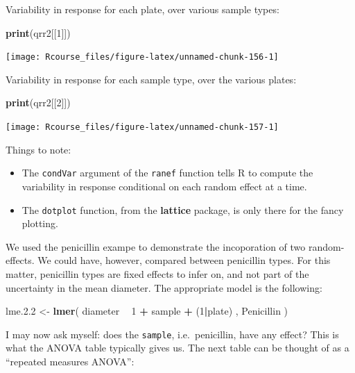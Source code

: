 \documentclass[]{book}
\newenvironment{Shaded}{\begin{snugshade}}{\end{snugshade}}
\newcommand{\KeywordTok}[1]{\textcolor[rgb]{0.13,0.29,0.53}{\textbf{#1}}}
\newcommand{\DecValTok}[1]{\textcolor[rgb]{0.00,0.00,0.81}{#1}}
\newcommand{\FloatTok}[1]{\textcolor[rgb]{0.00,0.00,0.81}{#1}}
\newcommand{\StringTok}[1]{\textcolor[rgb]{0.31,0.60,0.02}{#1}}
\newcommand{\OperatorTok}[1]{\textcolor[rgb]{0.81,0.36,0.00}{\textbf{#1}}}
\newcommand{\NormalTok}[1]{#1}
\providecommand{\tightlist}{%
  \setlength{\itemsep}{0pt}\setlength{\parskip}{0pt}}
\theoremstyle{definition}
\theoremstyle{definition}
\theoremstyle{definition}
\theoremstyle{remark}
\begin{document}
Variability in response for each plate, over various sample types:

\begin{Shaded}
\begin{Highlighting}[]
\KeywordTok{print}\NormalTok{(qrr2[[}\DecValTok{1}\NormalTok{]]) }
\end{Highlighting}
\end{Shaded}

\texttt{[image: Rcourse\_files/figure-latex/unnamed-chunk-156-1]}

Variability in response for each sample type, over the various plates:

\begin{Shaded}
\begin{Highlighting}[]
\KeywordTok{print}\NormalTok{(qrr2[[}\DecValTok{2}\NormalTok{]])  }
\end{Highlighting}
\end{Shaded}

\texttt{[image: Rcourse\_files/figure-latex/unnamed-chunk-157-1]}

Things to note:

\begin{itemize}
\tightlist
\item
  The \texttt{condVar} argument of the \texttt{ranef} function tells R
  to compute the variability in response conditional on each random
  effect at a time.
\item
  The \texttt{dotplot} function, from the \textbf{lattice} package, is
  only there for the fancy plotting.
\end{itemize}

We used the penicillin exampe to demonstrate the incoporation of two
random-effects. We could have, however, compared between penicillin
types. For this matter, penicillin types are fixed effects to infer on,
and not part of the uncertainty in the mean diameter. The appropriate
model is the following:

\begin{Shaded}
\begin{Highlighting}[]
\NormalTok{lme.}\FloatTok{2.2}\NormalTok{ <-}\StringTok{ }\KeywordTok{lmer}\NormalTok{( diameter }\OperatorTok{~}\StringTok{  }\DecValTok{1}  \OperatorTok{+}\StringTok{ }\NormalTok{sample }\OperatorTok{+}\StringTok{ }\NormalTok{(}\DecValTok{1}\OperatorTok{|}\NormalTok{plate) , Penicillin )}
\end{Highlighting}
\end{Shaded}

I may now ask myself: does the \texttt{sample}, i.e.~penicillin, have
any effect? This is what the ANOVA table typically gives us. The next
table can be thought of as a ``repeated measures ANOVA'':
\end{document}
